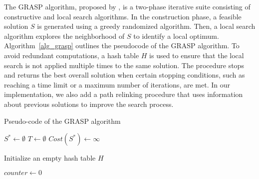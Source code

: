 \documentclass{article}
\begin{document}
The GRASP algorithm, proposed by \cite{feo1989probabilistic}, is a two-phase iterative suite consisting of constructive and local search algorithms. In the construction phase, a feasible solution $S$ is generated using a greedy randomized algorithm. Then, a local search algorithm explores the neighborhood of $S$ to identify a local optimum. Algorithm~\ref{alg_grasp} outlines the pseudocode of the GRASP algorithm. To avoid redundant computations, a hash table $H$ is used to ensure that the local search is not applied multiple times to the same solution.  The procedure stops and returns the best overall solution when certain stopping conditions, such as reaching a time limit or a maximum number of iterations, are met. In our implementation, we also add a path relinking procedure that uses information about previous solutions to improve the search process.

    {
        {\small
            \begin{algorithm}[hpt]
                \caption{Pseudo-code of the GRASP algorithm }
                \label{alg_grasp}
                \DontPrintSemicolon
                \LinesNumbered
                \setcounter{AlgoLine}{0}
                $S^* \leftarrow \emptyset$    \hspace{2mm} $T \leftarrow \emptyset$       $Cost(S^*) \leftarrow \infty$

                Initialize an empty hash table $H$

                $counter \leftarrow  0$


            \end{algorithm}}
    }
\end{document}
